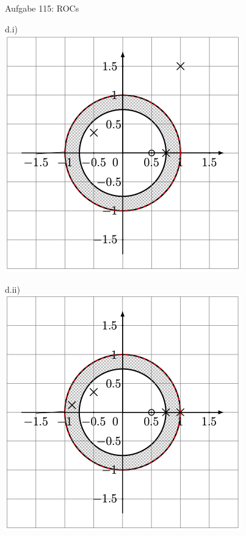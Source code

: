\documentclass[14pt, aspectratio=169, handout]{beamer}
\begin{document}
\begin{frame}{Aufgabe 115: ROCs}
    \begin{minipage}[t]{0.25\textwidth}
    d.i)\\
    \includegraphics[width=\linewidth]{figures/di.png}
\end{minipage}
\hfill
\begin{minipage}[t]{0.25\textwidth}
    d.ii)\\
    \includegraphics[width=\linewidth]{figures/dii.png}

\end{minipage}
\end{frame}
\end{document}
